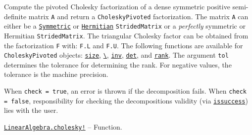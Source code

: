\begin{adjustwidth}{2em}{0pt}
Compute the pivoted Cholesky factorization of a dense symmetric positive semi-definite matrix \texttt{A} and return a \texttt{CholeskyPivoted} factorization. The matrix \texttt{A} can either be a \hyperlink{17683454167504168761}{\texttt{Symmetric}} or \hyperlink{938713992181310063}{\texttt{Hermitian}} \texttt{StridedMatrix} or a \emph{perfectly} symmetric or Hermitian \texttt{StridedMatrix}. The triangular Cholesky factor can be obtained from the factorization \texttt{F} with: \texttt{F.L} and \texttt{F.U}. The following functions are available for \texttt{CholeskyPivoted} objects: \hyperlink{17888996102305087038}{\texttt{size}}, \hyperlink{4639577998029770435}{\texttt{{\textbackslash}}}, \hyperlink{13336866048543706848}{\texttt{inv}}, \hyperlink{16543378577000914469}{\texttt{det}}, and \hyperlink{439390458422397873}{\texttt{rank}}. The argument \texttt{tol} determines the tolerance for determining the rank. For negative values, the tolerance is the machine precision.

When \texttt{check = true}, an error is thrown if the decomposition fails. When \texttt{check = false}, responsibility for checking the decomposition{\textquotesingle}s validity (via \hyperlink{10694198281534172656}{\texttt{issuccess}}) lies with the user.



\end{adjustwidth}
\hypertarget{3967830962731048730}{} 
\hyperlink{3967830962731048730}{\texttt{LinearAlgebra.cholesky!}}  -- {Function.}

